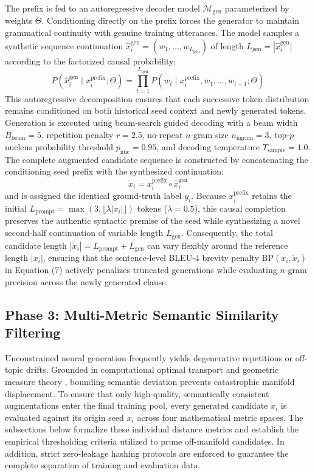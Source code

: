 \documentclass{ieeeaccess}
\begin{document}
The prefix is fed to an autoregressive decoder model $\mathcal{M}_{\text{gen}}$ parameterized by weights $\Theta$. Conditioning directly on the prefix forces the generator to maintain grammatical continuity with genuine training utterances. The model samples a synthetic sequence continuation $\hat{x}_i^{\text{gen}} = (w_1, \dots, w_{L_{\text{gen}}})$ of length $L_{\text{gen}} = |\hat{x}_i^{\text{gen}}|$ according to the factorized causal probability:
\begin{equation}
    P(\hat{x}_i^{\text{gen}} \mid x_i^{\text{prefix}}; \Theta) = \prod_{t=1}^{L_{\text{gen}}} P(w_t \mid x_i^{\text{prefix}}, w_1, \dots, w_{t-1}; \Theta)
\end{equation}
This autoregressive decomposition ensures that each successive token distribution remains conditioned on both historical seed context and newly generated tokens. Generation is executed using beam-search guided decoding with a beam width $B_{\text{beam}}=5$, repetition penalty $r=2.5$, no-repeat $n$-gram size $n_{\text{ngram}}=3$, top-$p$ nucleus probability threshold $p_{\text{nuc}}=0.95$, and decoding temperature $T_{\text{sample}}=1.0$. The complete augmented candidate sequence is constructed by concatenating the conditioning seed prefix with the synthesized continuation:
\begin{equation}
    \tilde{x}_i = x_i^{\text{prefix}} \circ \hat{x}_i^{\text{gen}}
\end{equation}
and is assigned the identical ground-truth label $y_i$. Because $x_i^{\text{prefix}}$ retains the initial $L_{\text{prompt}} = \max(3, \lfloor \lambda |x_i| \rfloor)$ tokens ($\lambda = 0.5$), this causal completion preserves the authentic syntactic premise of the seed while synthesizing a novel second-half continuation of variable length $L_{\text{gen}}$. Consequently, the total candidate length $|\tilde{x}_i| = L_{\text{prompt}} + L_{\text{gen}}$ can vary flexibly around the reference length $|x_i|$, ensuring that the sentence-level BLEU-4 brevity penalty $\text{BP}(x_i, \tilde{x}_i)$ in Equation (7) actively penalizes truncated generations while evaluating $n$-gram precision across the newly generated clause.

\subsection{Phase 3: Multi-Metric Semantic Similarity Filtering}
\label{subsec:phase3}

Unconstrained neural generation frequently yields degenerative repetitions or off-topic drifts. Grounded in computational optimal transport and geometric measure theory \cite{villani2009optimal, peyre2019computational}, bounding semantic deviation prevents catastrophic manifold displacement. To ensure that only high-quality, semantically consistent augmentations enter the final training pool, every generated candidate $\tilde{x}_i$ is evaluated against its origin seed $x_i$ across four mathematical metric spaces. The subsections below formalize these individual distance metrics and establish the empirical thresholding criteria utilized to prune off-manifold candidates. In addition, strict zero-leakage hashing protocols are enforced to guarantee the complete separation of training and evaluation data.
\end{document}
